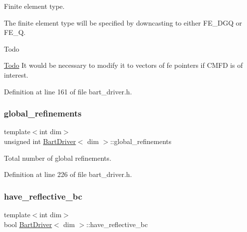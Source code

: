 Finite element type. 

The finite element type will be specified by downcasting to either F\+E\+\_\+\+D\+GQ or F\+E\+\_\+Q.

\begin{DoxyRefDesc}{Todo}
\item[\hyperlink{todo__todo000001}{Todo}]It would be necessary to modify it to vectors of fe pointers if C\+M\+FD is of interest. \end{DoxyRefDesc}


Definition at line 161 of file bart\+\_\+driver.\+h.

\mbox{\label{class_bart_driver_a1ddb881c78ef92c59f2c686b320c970e}} 
\subsubsection{\texorpdfstring{global\+\_\+refinements}{global\_refinements}}
{\footnotesize\ttfamily template$<$int dim$>$ \\
unsigned int \hyperlink{class_bart_driver}{Bart\+Driver}$<$ dim $>$\+::global\+\_\+refinements\hspace{0.3cm}{\ttfamily [private]}}



Total number of global refinements. 



Definition at line 226 of file bart\+\_\+driver.\+h.

\mbox{\label{class_bart_driver_ad42739169c4b4b97014c53a616f2d1ee}} 
\subsubsection{\texorpdfstring{have\+\_\+reflective\+\_\+bc}{have\_reflective\_bc}}
{\footnotesize\ttfamily template$<$int dim$>$ \\
bool \hyperlink{class_bart_driver}{Bart\+Driver}$<$ dim $>$\+::have\+\_\+reflective\+\_\+bc\hspace{0.3cm}{\ttfamily [private]}}



